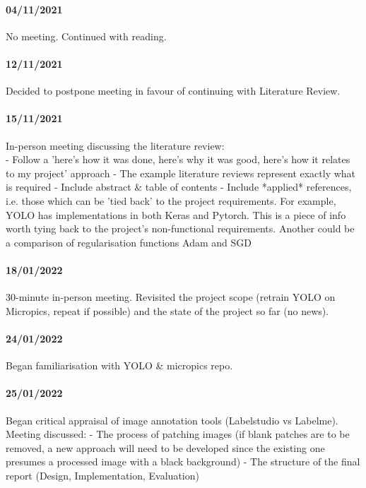 \begin{appendices}
\paragraph{04/11/2021}
No meeting. Continued with reading.

\paragraph{12/11/2021}
Decided to postpone meeting in favour of continuing with Literature Review.

\paragraph{15/11/2021}
In-person meeting discussing the literature review:\\
- Follow a 'here's how it was done, here's why it was good, here's how it relates to my  project' approach
- The example literature reviews represent exactly what is required
- Include abstract & table of contents
- Include *applied* references, i.e. those which can be 'tied back' to the project requirements. For example, YOLO has implementations in both Keras and Pytorch. This is a piece of info worth tying back to the project's non-functional requirements. Another could be a comparison of regularisation functions Adam and SGD

\paragraph{18/01/2022}
30-minute in-person meeting. Revisited the project scope (retrain YOLO on Micropics, repeat if possible) and the state of the project so far (no news).

\paragraph{24/01/2022}
Began familiarisation with YOLO & micropics repo.

\paragraph{25/01/2022}
Began critical appraisal of image annotation tools (Labelstudio vs Labelme).\\
Meeting discussed:
- The process of patching images (if blank patches are to be removed, a new approach will need to be developed since the existing one presumes a processed image with a black background)
- The structure of the final report (Design, Implementation, Evaluation)


\end{appendices}
